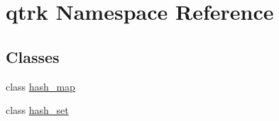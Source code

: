 \hypertarget{namespaceqtrk}{}\section{qtrk Namespace Reference}
\label{namespaceqtrk}
\subsection*{Classes}
\begin{DoxyCompactItemize}
\item 
class \hyperlink{classqtrk_1_1hash__map}{hash\+\_\+map}
\item 
class \hyperlink{classqtrk_1_1hash__set}{hash\+\_\+set}
\end{DoxyCompactItemize}
